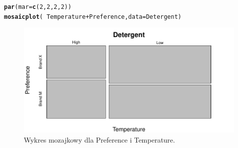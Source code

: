 \documentclass[12pt]{mwart}\usepackage[]{graphicx}\usepackage[]{color}
\makeatletter
\def\maxwidth{ %
  \ifdim\Gin@nat@width>\linewidth
    \linewidth
  \else
    \Gin@nat@width
  \fi
}
\newcommand{\hlnum}[1]{\textcolor[rgb]{0.686,0.059,0.569}{#1}}%
\newcommand{\hlopt}[1]{\textcolor[rgb]{0,0,0}{#1}}%
\newcommand{\hlstd}[1]{\textcolor[rgb]{0.345,0.345,0.345}{#1}}%
\newcommand{\hlkwc}[1]{\textcolor[rgb]{0.333,0.667,0.333}{#1}}%
\newcommand{\hlkwd}[1]{\textcolor[rgb]{0.737,0.353,0.396}{\textbf{#1}}}%
\newenvironment{kframe}{%
 \def\at@end@of@kframe{}%
 \ifinner\ifhmode%
  \def\at@end@of@kframe{\end{minipage}}%
  \begin{minipage}{\columnwidth}%
 \fi\fi%
 \def\FrameCommand##1{\hskip\@totalleftmargin \hskip-\fboxsep
 \colorbox{shadecolor}{##1}\hskip-\fboxsep
     \hskip-\linewidth \hskip-\@totalleftmargin \hskip\columnwidth}%
 \MakeFramed {\advance\hsize-\width
   \@totalleftmargin\z@ \linewidth\hsize
   \@setminipage}}%
 {\par\unskip\endMakeFramed%
 \at@end@of@kframe}
\newenvironment{knitrout}{}{} %
\makeatother
\begin{document}
\begin{knitrout}
\color{fgcolor}\begin{kframe}
\begin{alltt}
\hlkwd{par}\hlstd{(}\hlkwc{mar} \hlstd{=} \hlkwd{c}\hlstd{(}\hlnum{2}\hlstd{,} \hlnum{2}\hlstd{,} \hlnum{2}\hlstd{,} \hlnum{2}\hlstd{))}
\hlkwd{mosaicplot}\hlstd{(}\hlopt{~}\hlstd{Temperature}\hlopt{+}\hlstd{Preference,} \hlkwc{data} \hlstd{= Detergent)}
\end{alltt}
\end{kframe}\begin{figure}[H]
\includegraphics[width=\maxwidth]{figure/r_fig_5-1} \caption{\label{fig:5}Wykres mozajkowy dla Preference i Temperature.}\label{fig:r fig_5}
\end{figure}

\end{knitrout}
\end{document}
